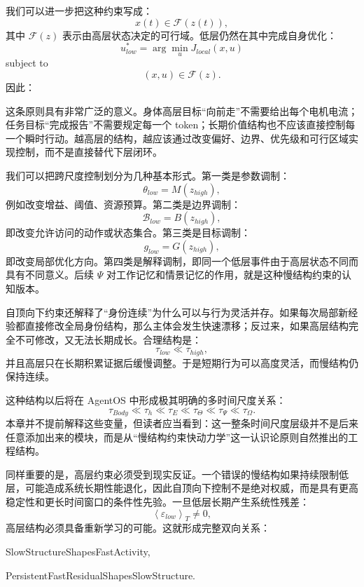 我们可以进一步把这种约束写成：
\[
x(t)\in\mathcal{F}(z(t)),
\]
其中 $\mathcal{F}(z)$ 表示由高层状态决定的可行域。低层仍然在其中完成自身优化：
\[
u^*_{low}
=
\arg\min_{u}
J_{local}(x,u)
\]
subject to
\[
(x,u)\in\mathcal{F}(z).
\]
因此：
\begin{statementbox}
\centering
{}
\end{statementbox}

这条原则具有非常广泛的意义。身体高层目标“向前走”不需要给出每个电机电流；任务目标“完成报告”不需要规定每一个 token；长期价值结构也不应该直接控制每一个瞬时行动。越高层的结构，越应该通过改变偏好、边界、优先级和可行区域实现控制，而不是直接替代下层闭环。

我们可以把跨尺度控制划分为几种基本形式。第一类是参数调制：
\[
\theta_{low}
=
M(z_{high}),
\]
例如改变增益、阈值、资源预算。第二类是边界调制：
\[
\mathcal B_{low}
=
B(z_{high}),
\]
即改变允许访问的动作或状态集合。第三类是目标调制：
\[
g_{low}
=
G(z_{high}),
\]
即改变局部优化方向。第四类是解释调制，即同一个低层事件由于高层状态不同而具有不同意义。后续 $\Psi$ 对工作记忆和情景记忆的作用，就是这种慢结构约束的认知版本。

自顶向下约束还解释了“身份连续”为什么可以与行为灵活并存。如果每次局部新经验都直接修改全局身份结构，那么主体会发生快速漂移；反过来，如果高层结构完全不可修改，又无法长期成长。合理结构是：
\[
\tau_{low}
\ll
\tau_{high},
\]
并且高层只在长期积累证据后缓慢调整。于是短期行为可以高度灵活，而慢结构仍保持连续。

这种结构以后将在 AgentOS 中形成极其明确的多时间尺度关系：
\[
\tau_{Body}
\ll
\tau_h
\ll
\tau_E
\ll
\tau_\Theta
\ll
\tau_\Psi
\ll
\tau_\Omega.
\]
本章并不提前解释这些变量，但读者应当看到：这一整条时间尺度层级并不是后来任意添加出来的模块，而是从“慢结构约束快动力学”这一认识论原则自然推出的工程结构。

同样重要的是，高层约束必须受到现实反证。一个错误的慢结构如果持续限制低层，可能造成系统长期性能退化，因此自顶向下控制不是绝对权威，而是具有更高稳定性和更长时间窗口的条件性先验。一旦低层长期产生系统性残差：
\[
\left\langle\varepsilon_{low}\right\rangle_T
\neq0,
\]
高层结构必须具备重新学习的可能。这就形成完整双向关系：
\begin{statementbox}
SlowStructureShapesFastActivity,
\end{statementbox}
\begin{statementbox}
PersistentFastResidualShapesSlowStructure.
\end{statementbox}

